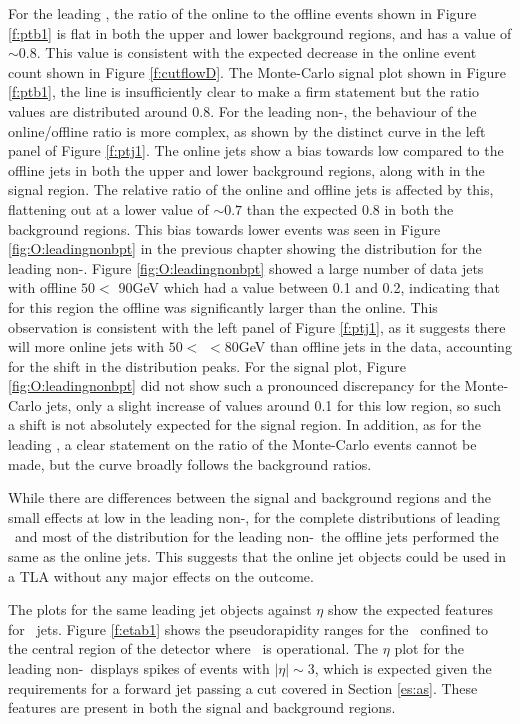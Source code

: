     For the leading \bjet, the ratio of the online to the offline events shown in Figure \ref{f:ptb1} is flat in both the upper and lower background regions, and has a value of $\sim0.8$. This value is consistent with the expected decrease in the online event count shown in Figure \ref{f:cutflowD}. The Monte-Carlo signal plot shown in Figure \ref{f:ptb1}, the line is insufficiently clear to make a firm statement but the ratio values are distributed around $0.8$. For the leading non-\bjet, the behaviour of the online/offline ratio is more complex, as shown by the distinct curve in the left panel of Figure \ref{f:ptj1}. The online jets show a bias towards low \pt compared to the offline jets in both the upper and lower background regions, along with in the signal region. The relative ratio of the online and offline jets is affected by this, flattening out at a lower value of $\sim0.7$ than the expected $0.8$ in both the background regions. This bias towards lower \pt events was seen in Figure \ref{fig:O:leadingnonbpt} in the previous chapter showing the \dptpt distribution for the leading non-\bjet. Figure \ref{fig:O:leadingnonbpt} showed a large number of data jets with offline $50<$ \pt$90$GeV which had a \dptpt value between 0.1 and 0.2, indicating that for this region the offline \pt was significantly larger than the online. This observation is consistent with the left panel of Figure \ref{f:ptj1}, as it suggests there will more online jets with $50<$ \pt$<80$GeV than offline jets in the data, accounting for the shift in the distribution peaks. For the signal plot, Figure \ref{fig:O:leadingnonbpt} did not show such a pronounced discrepancy for the Monte-Carlo jets, only a slight increase of \dptpt values around 0.1 for this low \pt region, so such a shift is not absolutely expected for the signal region. In addition, as for the leading \bjet, a clear statement on the ratio of the Monte-Carlo events cannot be made, but the curve broadly follows the background ratios.

    While there are differences between the signal and background regions and the small effects at low \pt in the leading non-\bjets, for the complete \pt distributions of leading \bjet\ and most of the distribution for the leading non-\bjet\, the offline jets performed the same as the online jets. This suggests that the online jet objects could be used in a TLA without any major effects on the outcome.

    The plots for the same leading jet objects against $\eta$ show the expected features for \VBFHBB\ jets. Figure \ref{f:etab1} shows the pseudorapidity ranges for the \bjet\ confined to the central region of the detector where \btag\ is operational. The $\eta$ plot for the leading non-\bjet\ displays spikes of events with $|\eta|\sim3$, which is expected given the requirements for a forward jet passing a \pt cut covered in Section \ref{es:as}. These features are present in both the signal and background regions.

